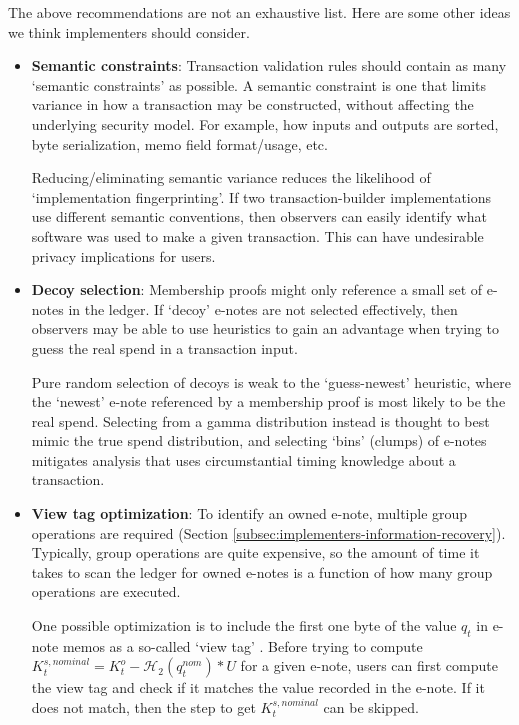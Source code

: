 The above recommendations are not an exhaustive list. Here are some other ideas we think implementers should consider.

\begin{itemize}
    \item \textbf{Semantic constraints}: Transaction validation rules should contain as many `semantic constraints' as possible. A semantic constraint is one that limits variance in how a transaction may be constructed, without affecting the underlying security model. For example, how inputs and outputs are sorted, byte serialization, memo field format/usage, etc.

    Reducing/eliminating semantic variance reduces the likelihood of `implementation fingerprinting'. If two transaction-builder implementations use different semantic conventions, then observers can easily identify what software was used to make a given transaction. This can have undesirable privacy implications for users.

    \item \textbf{Decoy selection}: Membership proofs might only reference a small set of e-notes in the ledger. If `decoy' e-notes are not selected effectively, then observers may be able to use heuristics to gain an advantage when trying to guess the real spend in a transaction input.

    Pure random selection of decoys is weak to the `guess-newest' heuristic, where the `newest' e-note referenced by a membership proof is most likely to be the real spend. Selecting from a gamma distribution instead is thought to best mimic the true spend distribution, and selecting `bins' (clumps) of e-notes mitigates analysis that uses circumstantial timing knowledge about a transaction. \cite{AnalysisOfLinkability}

    \item \textbf{View tag optimization}: To identify an owned e-note, multiple group operations are required (Section \ref{subsec:implementers-information-recovery}). Typically, group operations are quite expensive, so the amount of time it takes to scan the ledger for owned e-notes is a function of how many group operations are executed.

    One possible optimization is to include the first one byte of the value $q_t$ in e-note memos as a so-called `view tag' \cite{reduce-scan-times-view-tag-research-issue-73}. Before trying to compute $K^{s,nominal}_t = K^o_t - \mathcal{H}_2(q^{nom}_t)*U$ for a given e-note, users can first compute the view tag and check if it matches the value recorded in the e-note. If it does not match, then the step to get $K^{s,nominal}_t$ can be skipped.


\end{itemize}
